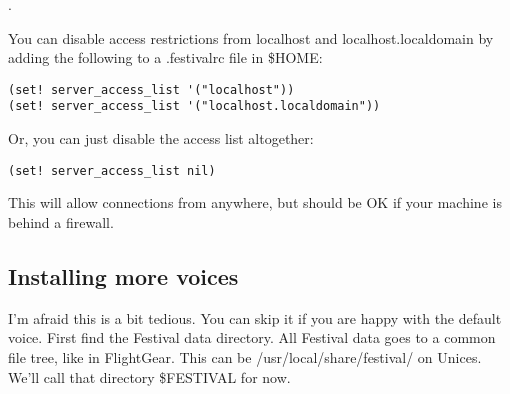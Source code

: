.

You can disable access restrictions from localhost and localhost.localdomain by adding
the following to a .festivalrc file in \$HOME:
\begin{verbatim}
(set! server_access_list '("localhost"))
(set! server_access_list '("localhost.localdomain"))
\end{verbatim}

Or, you can just disable the access list altogether:

\begin{verbatim}
(set! server_access_list nil)
\end{verbatim}

This will allow connections from anywhere, but should be OK if your machine is behind a
firewall.

\subsection{Installing more voices}

I'm afraid this is a bit tedious. You can skip it if you are happy with the default voice.
First find the Festival data directory. All Festival data goes to a common file tree,
like in FlightGear. This can be /usr/local/share/festival/ on Unices. We'll call that
directory \$FESTIVAL for now.


